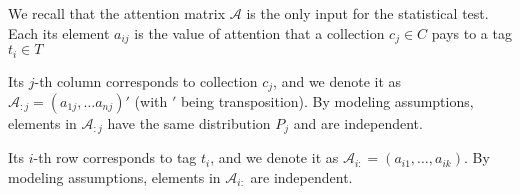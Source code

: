 We recall that the attention matrix $\mathcal{A}$ is the only input for the statistical test. Each its element $a_{ij}$ is the value of attention that a collection $c_j \in C$ pays to a tag $t_i \in T$

Its $j$-th  column corresponds to collection $c_j$, and we denote it as $\mathcal{A}_{:j} =(a_{1j}, \dots a_{nj})'$ (with $'$ being transposition). By modeling assumptions, elements in $\mathcal{A}_{:j}$ have the same distribution $P_j$ and are independent.

Its $i$-th row corresponds to tag $t_i$, and we denote it as $\mathcal{A}_{i:} = (a_{i1}, \dots, a_{ik})$.
By modeling assumptions, elements in $\mathcal{A}_{i:}$ are independent.